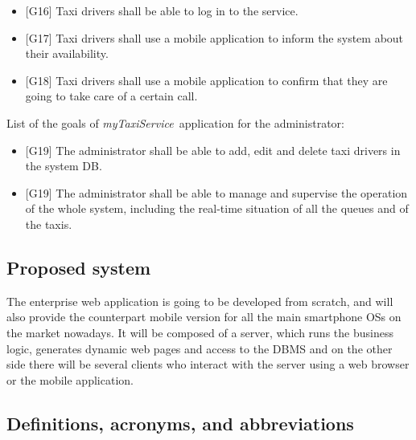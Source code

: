 \documentclass[a4paper,11pt]{report} %
\newcommand{\mts}{\mbox{\normalfont\itshape myTaxiService\ }}
\begin{document}
		\begin{itemize}
			\item {[}G16{]} Taxi drivers shall be able to log in to the service.
			\item {[}G17{]} Taxi drivers shall use a mobile application to inform the system about their availability.
			\item {[}G18{]} Taxi drivers shall use a mobile application to confirm that they are going to take care of a certain call.
		\end{itemize}
		List of the goals of \mts application for the administrator:
		\begin{itemize}
			\item {[}G19{]} The administrator shall be able to add, edit and delete taxi drivers in the system DB.
			\item {[}G19{]} The administrator shall be able to manage and supervise the operation of the whole system, including the real-time situation of all the queues and of the taxis.
		\end{itemize}
		
		
		
	\subsection{Proposed system}
	The enterprise web application is going to be developed from scratch, and will also provide the counterpart mobile version for all the main smartphone OSs on the market nowadays. It will be composed of a server, which runs the business logic, generates dynamic web pages and access to the DBMS and on the other side there will be several clients who interact with the server using a web browser or the mobile application.
	
	\subsection{Definitions, acronyms, and abbreviations}
	
\end{document}
